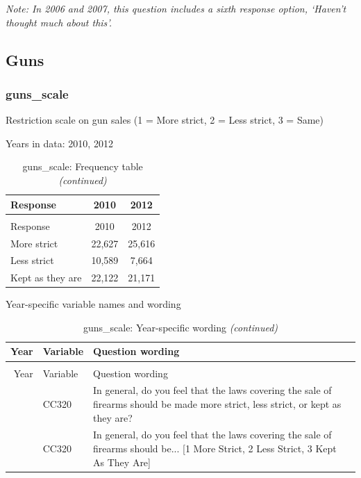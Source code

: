 \documentclass[
  12pt]{article}
\begin{document}
\emph{Note: In 2006 and 2007, this question includes a sixth response
option, `Haven't thought much about this'.}

\newpage

\hypertarget{guns}{%
\subsection{Guns}\label{guns}}

\hypertarget{guns_scale}{%
\subsubsection{guns\_scale}\label{guns_scale}}

Restriction scale on gun sales (1 = More strict, 2 = Less strict, 3 =
Same)

Years in data: 2010, 2012\begingroup\fontsize{10}{12}\selectfont

\begin{longtable}[t]{lcc}
\caption{\label{tab:unnamed-chunk-5}guns\_scale: Frequency table}\\
\toprule
Response & 2010 & 2012\\
\midrule
\endfirsthead
\caption[]{guns\_scale: Frequency table \textit{(continued)}}\\
\toprule
Response & 2010 & 2012\\
\midrule
\endhead

\endfoot
\bottomrule
\endlastfoot
More strict & 22,627 & 25,616\\
Less strict & 10,589 & 7,664\\
Kept as they are & 22,122 & 21,171\\*
\end{longtable}
\endgroup{}

Year-specific variable names and
wording\begingroup\fontsize{11}{13}\selectfont

\begin{longtable}[t]{rl>{\raggedright\arraybackslash}p{10cm}}
\caption{\label{tab:unnamed-chunk-5}guns\_scale: Year-specific wording}\\
\toprule
Year & Variable & Question wording\\
\midrule
\endfirsthead
\caption[]{guns\_scale: Year-specific wording \textit{(continued)}}\\
\toprule
Year & Variable & Question wording\\
\midrule
\endhead

\endfoot
\bottomrule
\endlastfoot
2010 & CC320 & In general, do you feel that the laws covering the sale of firearms should be made more strict, less strict, or kept as they are?\\
\addlinespace
2012 & CC320 & In general, do you feel that the laws covering the sale of firearms should be... [1 More Strict, 2 Less Strict, 3 Kept As They Are]\\*
\end{longtable}
\endgroup{}
\end{document}
